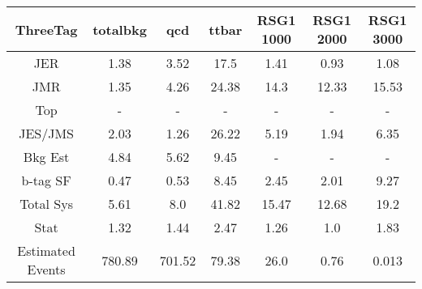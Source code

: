 \begin{footnotesize} 
\begin{tabular}{c|c|c|c|c|c|c} 
ThreeTag & totalbkg & qcd & ttbar & RSG1 1000 & RSG1 2000 & RSG1 3000 \\ 
\hline\hline 
JER & 1.38 & 3.52 & 17.5 & 1.41 & 0.93 & 1.08\\ 
JMR & 1.35 & 4.26 & 24.38 & 14.3 & 12.33 & 15.53\\ 
Top &  -  &  -  &  -  &  -  &  -  &  - \\ 
JES/JMS & 2.03 & 1.26 & 26.22 & 5.19 & 1.94 & 6.35\\ 
Bkg Est & 4.84 & 5.62 & 9.45 &  -  &  -  &  - \\ 
b-tag SF & 0.47 & 0.53 & 8.45 & 2.45 & 2.01 & 9.27\\ 
\hline 
Total Sys & 5.61 & 8.0 & 41.82 & 15.47 & 12.68 & 19.2\\ 
\hline 
Stat & 1.32 & 1.44 & 2.47 & 1.26 & 1.0 & 1.83\\ 
\hline 
Estimated Events & 780.89 & 701.52 & 79.38 & 26.0 & 0.76 & 0.013\\ 
\hline\hline 
\end{tabular} 
\end{footnotesize} 
\newline 

